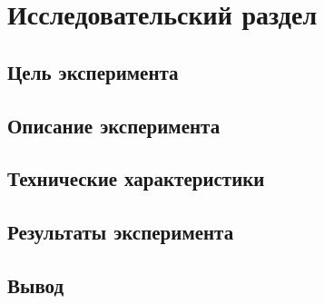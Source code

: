 \chapter{Исследовательский раздел}


\section{Цель эксперимента}


\section{Описание эксперимента}





\section{Технические характеристики}

\section{Результаты эксперимента}


\section*{Вывод}




